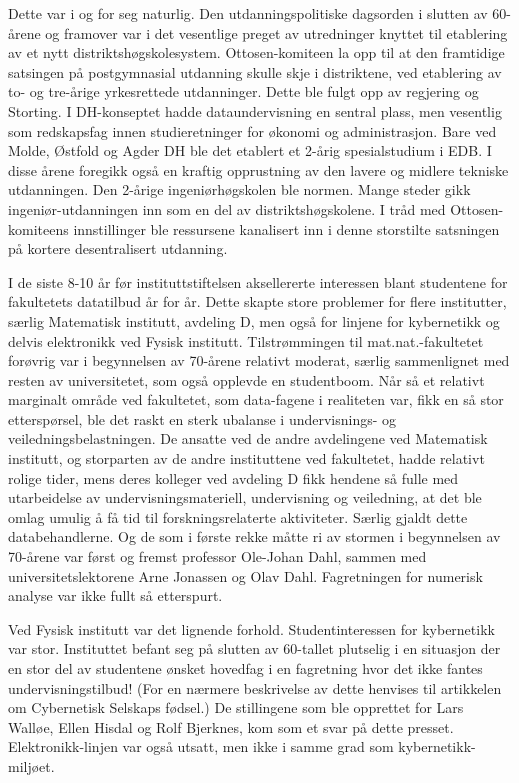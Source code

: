 Dette var i og for seg naturlig. Den utdanningspolitiske dagsorden i slutten av 60-årene og framover var i det vesentlige preget av utredninger knyttet til etablering av et nytt distriktshøgskolesystem. Ottosen-komiteen la opp til at den framtidige satsingen på postgymnasial utdanning skulle skje i distriktene, ved etablering av to- og tre-årige yrkesrettede utdanninger. Dette ble fulgt opp av regjering og Storting. I DH-konseptet hadde dataundervisning en sentral plass, men vesentlig som redskapsfag innen studieretninger for økonomi og administrasjon. Bare ved Molde, Østfold og Agder DH ble det etablert et 2-årig spesialstudium i EDB. I disse årene foregikk også en kraftig opprustning av den lavere og midlere tekniske utdanningen. Den 2-årige ingeniørhøgskolen ble normen. Mange steder gikk ingeniør-utdanningen inn som en del av distriktshøgskolene. I tråd med Ottosen-komiteens innstillinger ble ressursene kanalisert inn i denne storstilte satsningen på kortere desentralisert utdanning.

I de siste 8-10 år før instituttstiftelsen aksellererte interessen blant studentene for fakultetets datatilbud år for år. Dette skapte store problemer for flere institutter, særlig Matematisk institutt, avdeling D, men også for linjene for kybernetikk og delvis elektronikk ved Fysisk institutt. Tilstrømmingen til mat.nat.-fakultetet forøvrig var i begynnelsen av 70-årene relativt moderat, særlig sammenlignet med resten av universitetet, som også opplevde en
studentboom. Når så et relativt marginalt område ved fakultetet, som data-fagene i realiteten var, fikk en så stor etterspørsel, ble det raskt en sterk ubalanse i undervisnings- og veiledningsbelastningen. De ansatte ved de andre avdelingene ved Matematisk institutt, og storparten av de andre instituttene ved fakultetet, hadde relativt rolige tider, mens deres kolleger ved avdeling D fikk hendene så fulle med utarbeidelse av undervisningsmateriell, undervisning og veiledning, at det ble omlag umulig å få tid til forskningsrelaterte aktiviteter. Særlig gjaldt dette databehandlerne. Og de som i første rekke måtte ri av stormen i begynnelsen av 70-årene var først og fremst professor Ole-Johan Dahl, sammen med universitetslektorene Arne Jonassen og Olav Dahl. Fagretningen for numerisk analyse var ikke fullt så etterspurt.

Ved Fysisk institutt var det lignende forhold. Studentinteressen for kybernetikk var stor. Instituttet befant seg på slutten av 60-tallet plutselig i en situasjon der en stor del av studentene ønsket hovedfag i en fagretning hvor det ikke fantes undervisningstilbud! (For en nærmere beskrivelse av dette henvises til artikkelen om Cybernetisk Selskaps fødsel.) De stillingene som ble opprettet for Lars Walløe, Ellen Hisdal og Rolf Bjerknes, kom som et svar på dette presset. Elektronikk-linjen var også utsatt, men ikke i samme grad som kybernetikk-miljøet.

